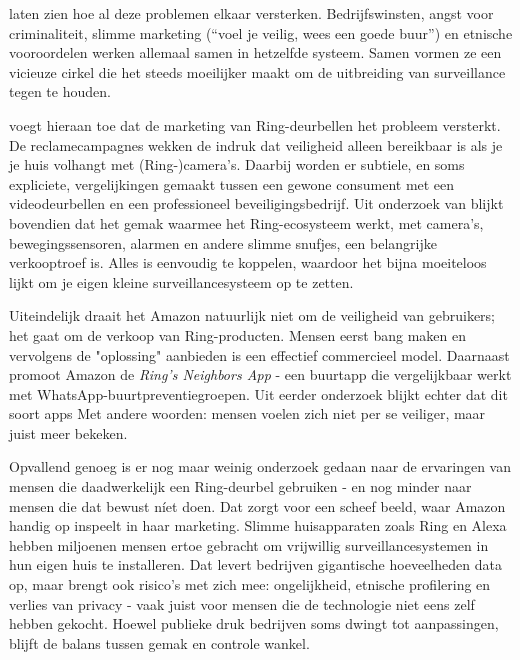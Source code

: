 \documentclass[nonacm, sigconf, balance=true]{acmart}
\begin{document}
    \citeauthor{selinger2022amazon} laten zien hoe al deze problemen elkaar versterken.
    Bedrijfswinsten, angst voor criminaliteit, slimme marketing (``voel je veilig, wees een goede buur'') en etnische vooroordelen werken allemaal samen in hetzelfde systeem.
    Samen vormen ze een vicieuze cirkel die het steeds moeilijker maakt om de uitbreiding van surveillance tegen te houden.

    \noindent \parencite{kelly2023ring} voegt hieraan toe dat de marketing van Ring-deurbellen het probleem versterkt.
    De reclamecampagnes wekken de indruk dat veiligheid alleen bereikbaar is als je je huis volhangt met (Ring-)camera's.
    Daarbij worden er subtiele, en soms expliciete, vergelijkingen gemaakt tussen een gewone consument met een videodeurbellen en een professioneel beveiligingsbedrijf.
    Uit onderzoek van \citeauthor{kelly2023ring} blijkt bovendien dat het gemak waarmee het Ring-ecosysteem werkt, met camera's, bewegingssensoren, alarmen en andere slimme snufjes, een belangrijke verkooptroef is.
    Alles is eenvoudig te koppelen, waardoor het bijna moeiteloos lijkt om je eigen kleine surveillancesysteem op te zetten.

    \noindent Uiteindelijk draait het Amazon natuurlijk niet om de veiligheid van gebruikers; het gaat om de verkoop van Ring-producten.
    Mensen eerst bang maken en vervolgens de "oplossing" aanbieden is een effectief commercieel model.
    Daarnaast promoot Amazon de \textit{Ring's Neighbors App} - een buurtapp die vergelijkbaar werkt met WhatsApp-buurtpreventiegroepen.
    Uit eerder onderzoek blijkt echter dat dit soort apps
    Met andere woorden: mensen voelen zich niet per se veiliger, maar juist meer bekeken.

    \noindent Opvallend genoeg is er nog maar weinig onderzoek gedaan naar de ervaringen van mensen die daadwerkelijk een Ring-deurbel gebruiken - en nog minder naar mensen die dat bewust níet doen.
    Dat zorgt voor een scheef beeld, waar Amazon handig op inspeelt in haar marketing.
    Slimme huisapparaten zoals Ring en Alexa hebben miljoenen mensen ertoe gebracht om vrijwillig surveillancesystemen in hun eigen huis te installeren.
    Dat levert bedrijven gigantische hoeveelheden data op, maar brengt ook risico's met zich mee: ongelijkheid, etnische profilering en verlies van privacy - vaak juist voor mensen die de technologie niet eens zelf hebben gekocht.
    Hoewel publieke druk bedrijven soms dwingt tot aanpassingen, blijft de balans tussen gemak en controle wankel.
\end{document}
